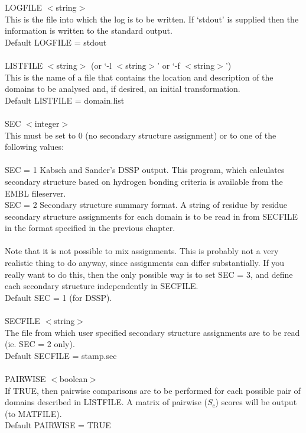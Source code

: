 LOGFILE $<$string$>$\\
This is the file into which the log is to be written.  If
`stdout' is supplied then the information is written to the
standard output.\\
Default LOGFILE = stdout\\
\\
LISTFILE $<$string$>$ (or `-l $<$string$>$' or `-f $<$string$>$')\\
This is the name of a file that contains the location and
description of the domains to be analysed and, if desired, an
initial transformation.\\  
Default LISTFILE = domain.list\\
\\
SEC $<$integer$>$\\
This must be set to 0 (no secondary structure assignment) or
to one of the following values:\\
\\
SEC = 1 Kabsch and Sander's DSSP output.  This program, which
calculates secondary structure based on hydrogen bonding criteria 
\cite{dssp} is available from the EMBL fileserver.
\\
SEC = 2 Secondary structure summary format.  A string of residue by
residue secondary structure assignments for each domain is to be 
read in from SECFILE in the format specified in the previous chapter.\\
\\
Note that it is not possible to mix assignments.  This is probably
not a very realistic thing to do anyway, since assignments can
differ substantially.  If you really want to do this, then the only
possible way is to set SEC = 3, and define each secondary structure
independently in SECFILE.\\
Default SEC = 1 (for DSSP).\\
\\
SECFILE $<$string$>$\\
The file from which user specified secondary structure assignments
are to be read (ie. SEC = 2 only).\\
Default SECFILE = stamp.sec\\
\\
PAIRWISE $<$boolean$>$\\
If TRUE, then pairwise comparisons are to be performed for each 
possible pair of domains described in LISTFILE.  A matrix of
pairwise ($S_{c}$) scores will be output (to MATFILE).\\
Default PAIRWISE = TRUE\\
